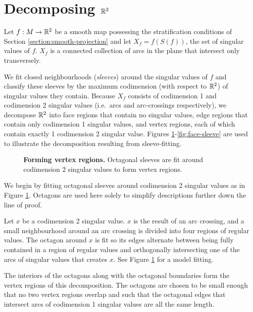 \section{Decomposing $\mathbb{R}^2$}
\label{section:smooth-decompose}

Let $f:M\to\mathbb{R}^2$ be a smooth map possessing the stratification conditions of Section \ref{section:smooth-projection} and let $X_f = f(S(f))$, the set of singular values of $f$.
$X_f$ is a connected collection of arcs in the plane that intersect only transversely.

We fit closed neighbourhoods (\emph{sleeves}) around the singular values of $f$ and classify these sleeves by the maximum codimension (with respect to $\mathbb{R}^2$) of singular values they contain.
Because $X_f$ consists of codimension 1 and codimension 2 singular values (i.e.\ arcs and arc-crossings respectively), we decompose $\mathbb{R}^2$ into face regions that contain no singular values, edge regions that contain only codimension 1 singular values, and vertex regions, each of which contain exactly 1 codimension 2 singular value.
Figures \ref{fig:vertex-sleeve}-\ref{fig:face-sleeve} are used to illustrate the decomposition resulting from sleeve-fitting.

\begin{figure}[h!]
	\caption{
		\textbf{Forming vertex regions.}
		Octagonal sleeves are fit around codimension 2 singular values to form vertex regions.
	}
	\label{fig:vertex-sleeve}
\end{figure}

We begin by fitting octagonal sleeves around codimension 2 singular values as in Figure \ref{fig:vertex-sleeve}.
Octagons are used here solely to simplify descriptions further down the line of proof.

Let $x$ be a codimension 2 singular value.
$x$ is the result of an arc crossing, and a small neighbourhood around an arc crossing is divided into four regions of regular values.
The octagon around $x$ is fit so its edges alternate between being fully contained in a region of regular values and orthogonally intersecting one of the arcs of singular values that creates $x$.
See Figure \ref{fig:vertex-sleeve} for a model fitting.

The interiors of the octagons along with the octagonal boundaries form the vertex regions of this decomposition.
The octagons are chosen to be small enough that no two vertex regions overlap and such that the octagonal edges that intersect arcs of codimension 1 singular values are all the same length.

